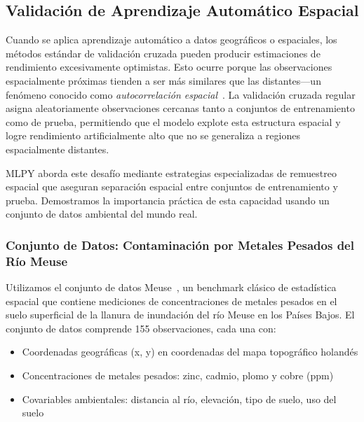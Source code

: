 
\subsection{Validación de Aprendizaje Automático Espacial}
\label{sec:spatial_validation}

Cuando se aplica aprendizaje automático a datos geográficos o espaciales, los métodos estándar de validación cruzada pueden producir estimaciones de rendimiento excesivamente optimistas. Esto ocurre porque las observaciones espacialmente próximas tienden a ser más similares que las distantes---un fenómeno conocido como \emph{autocorrelación espacial}~\citep{tobler1970computer}. La validación cruzada regular asigna aleatoriamente observaciones cercanas tanto a conjuntos de entrenamiento como de prueba, permitiendo que el modelo explote esta estructura espacial y logre rendimiento artificialmente alto que no se generaliza a regiones espacialmente distantes.

MLPY aborda este desafío mediante estrategias especializadas de remuestreo espacial que aseguran separación espacial entre conjuntos de entrenamiento y prueba. Demostramos la importancia práctica de esta capacidad usando un conjunto de datos ambiental del mundo real.

\subsubsection{Conjunto de Datos: Contaminación por Metales Pesados del Río Meuse}

Utilizamos el conjunto de datos Meuse~\citep{burrough1998principles, rikken1993soil}, un benchmark clásico de estadística espacial que contiene mediciones de concentraciones de metales pesados en el suelo superficial de la llanura de inundación del río Meuse en los Países Bajos. El conjunto de datos comprende 155 observaciones, cada una con:

\begin{itemize}
\item Coordenadas geográficas (x, y) en coordenadas del mapa topográfico holandés
\item Concentraciones de metales pesados: zinc, cadmio, plomo y cobre (ppm)
\item Covariables ambientales: distancia al río, elevación, tipo de suelo, uso del suelo
\end{itemize}

